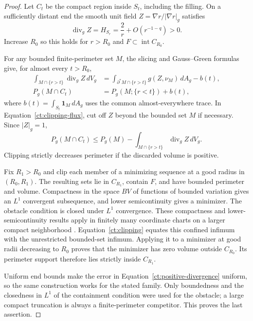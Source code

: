 \begin{proof}
Let $C_t$ be the compact region inside $S_t$, including the filling.
On a sufficiently distant end the smooth unit field
$Z=\nabla r/|\nabla r|_g$ satisfies
\begin{equation}
\label{ct:positive-divergence}
 \operatorname{div}_g Z=H_{S_r}=\frac2r+O(r^{-1-q})>0.
\end{equation}
Increase $R_0$ so this holds for $r>R_0$ and
$F\subset\operatorname{int}C_{R_0}$.

For any bounded finite-perimeter set $M$, the slicing and Gauss--Green
formulas give, for almost every $t>R_0$,
\begin{align}
 \int_{M\cap\{r>t\}}\operatorname{div}_g Z\,dV_g
 &=\int_{\partial^*M\cap\{r>t\}}g(Z,\nu_M)\,dA_g-b(t),
 \label{ct:clipping-flux}\\
 P_g(M\cap C_t)&=P_g(M;\{r<t\})+b(t),
 \label{ct:clipping-perimeter}
\end{align}
where $b(t)=\int_{S_t}\mathbf1_M\,dA_g$ uses the common
almost-everywhere trace. In Equation~\ref{ct:clipping-flux}, cut off
$Z$ beyond the bounded set $M$ if necessary. Since $|Z|_g=1$,
\begin{equation}
\label{ct:clipping}
 P_g(M\cap C_t)\leq P_g(M)-
       \int_{M\cap\{r>t\}}\operatorname{div}_g Z\,dV_g.
\end{equation}
Clipping strictly decreases perimeter if the discarded volume is
positive.

Fix $R_1>R_0$ and clip each member of a minimizing sequence at a good
radius in $(R_0,R_1)$. The resulting sets lie in $C_{R_1}$, contain $F$,
and have bounded perimeter and volume. Compactness in the space $BV$ of
functions of bounded variation gives an
$L^1$ convergent subsequence, and lower semicontinuity gives a minimizer.
The obstacle condition is closed under $L^1$ convergence. These
compactness and lower-semicontinuity results apply in finitely many
coordinate charts on a larger compact neighborhood
\cite[Theorem~3.23 and Proposition~3.6]{AmbrosioFuscoPallara2000}.
Equation~\ref{ct:clipping} equates this confined infimum with the
unrestricted bounded-set infimum. Applying it to a minimizer at good
radii decreasing to $R_0$ proves that the minimizer has zero volume
outside $C_{R_0}$. Its perimeter support therefore lies strictly inside
$C_{R_1}$.

Uniform end bounds make the error in
Equation~\ref{ct:positive-divergence} uniform, so the same construction
works for the stated family.
Only boundedness and the closedness in $L^1$ of the containment
condition were used for the obstacle; a large compact truncation is
always a finite-perimeter competitor. This proves the last assertion.
\end{proof}

